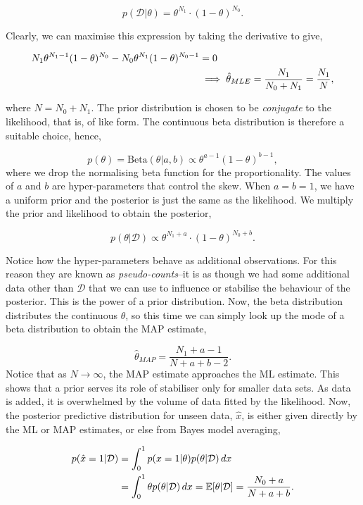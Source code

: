 \documentclass[11pt]{amsart}
\begin{document}
$$p(\mathcal{D}|\theta) = \theta^{N_1}\cdot(1 - \theta)^{N_0}.$$

Clearly, we can maximise this expression by taking the derivative to give,

\begin{align}
N_1\theta^{N_1 - 1}(1 - \theta)^{N_0} - N_0\theta^{N_1}(1 - \theta)^{N_0 - 1} &= 0 \notag \\
&\implies \hat\theta_{MLE} = \frac{N_1}{N_0 + N_1} = \frac{N_1}{N}, \notag
\end{align}

where $N = N_0 + N_1$. The prior distribution is chosen to be \emph{conjugate} to the likelihood, that is, of like form. The continuous beta distribution is therefore a suitable choice, hence,

$$p(\theta) = \text{Beta}(\theta|a, b) \propto \theta^{a - 1}(1 - \theta)^{b - 1},$$ where we drop the normalising beta function for the proportionality. The values of $a$ and $b$ are hyper-parameters that control the skew. When $a = b = 1$, we have a uniform prior and the posterior is just the same as the likelihood. We multiply the prior and likelihood to obtain the posterior,

$$p(\theta|\mathcal{D}) \propto \theta^{N_1 + a}\cdot(1 - \theta)^{N_0 + b}.$$

Notice how the hyper-parameters behave as additional observations. For this reason they are known as \emph{pseudo-counts}--it is as though we had some additional data other than $\mathcal{D}$ that we can use to influence or stabilise the behaviour of the posterior. This is the power of a prior distribution. Now, the beta distribution distributes the continuous $\theta$, so this time we can simply look up the mode of a beta distribution to obtain the MAP estimate,

$$\hat\theta_{MAP} = \frac{N_1 + a - 1}{N + a + b - 2}.$$ Notice that as $N \to \infty$, the MAP estimate approaches the ML estimate. This shows that a prior serves its role of stabiliser only for smaller data sets. As data is added, it is overwhelmed by the volume of data fitted by the likelihood. Now, the posterior predictive distribution for unseen data, $\hat{x}$, is either given directly by the ML or MAP estimates, or else from Bayes model averaging,

\begin{align}
p(\hat{x} = 1|\mathcal{D}) &= \int_0^1 p(x = 1 |\theta)p(\theta|\mathcal{D})\mathop{dx} \notag \\
&= \int_0^1 \theta p(\theta|\mathcal{D})\mathop{dx} = \mathbb{E}[\theta|\mathcal{D}] = \frac{N_0 + a}{N + a + b}. \notag
\end{align}
\end{document}
